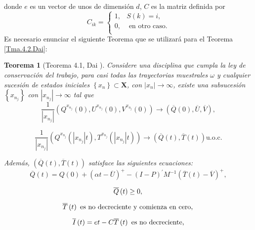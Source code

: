 \documentclass{article}
\newtheorem{Teo}{Teorema}[section]
\numberwithin{equation}{section}
\begin{document}
donde $e$ es un vector de unos de dimensi\'on $d$, $C$ es la
matriz definida por
\[C_{ik}=\left\{\begin{array}{cc}
1,& S\left(k\right)=i,\\
0,& \textrm{ en otro caso}.\\
\end{array}\right.
\]
Es necesario enunciar el siguiente Teorema que se utilizar\'a para
el Teorema \ref{Tma.4.2.Dai}:
\begin{Teo}[Teorema 4.1, Dai \cite{Dai}]
Considere una disciplina que cumpla la ley de conservaci\'on del
trabajo, para casi todas las trayectorias muestrales $\omega$ y
cualquier sucesi\'on de estados iniciales
$\left\{x_{n}\right\}\subset \mathbf{X}$, con
$|x_{n}|\rightarrow\infty$, existe una subsucesi\'on
$\left\{x_{n_{j}}\right\}$ con $|x_{n_{j}}|\rightarrow\infty$ tal
que
\begin{equation}\label{Eq.4.15}
\frac{1}{|x_{n_{j}}|}\left(Q^{x_{n_{j}}}\left(0\right),U^{x_{n_{j}}}\left(0\right),V^{x_{n_{j}}}\left(0\right)\right)\rightarrow\left(\overline{Q}\left(0\right),\overline{U},\overline{V}\right),
\end{equation}

\begin{equation}\label{Eq.4.16}
\frac{1}{|x_{n_{j}}|}\left(Q^{x_{n_{j}}}\left(|x_{n_{j}}|t\right),T^{x_{n_{j}}}\left(|x_{n_{j}}|t\right)\right)\rightarrow\left(\overline{Q}\left(t\right),\overline{T}\left(t\right)\right)\textrm{
u.o.c.}
\end{equation}

Adem\'as,
$\left(\overline{Q}\left(t\right),\overline{T}\left(t\right)\right)$
satisface las siguientes ecuaciones:
\begin{equation}\label{Eq.MF.1.3a}
\overline{Q}\left(t\right)=Q\left(0\right)+\left(\alpha
t-\overline{U}\right)^{+}-\left(I-P\right)^{'}M^{-1}\left(\overline{T}\left(t\right)-\overline{V}\right)^{+},
\end{equation}

\begin{equation}\label{Eq.MF.2.3a}
\overline{Q}\left(t\right)\geq0,\\
\end{equation}

\begin{equation}\label{Eq.MF.3.3a}
\overline{T}\left(t\right)\textrm{ es no decreciente y comienza en cero},\\
\end{equation}

\begin{equation}\label{Eq.MF.4.3a}
\overline{I}\left(t\right)=et-C\overline{T}\left(t\right)\textrm{
es no decreciente,}\\
\end{equation}


\end{Teo}
\end{document}
